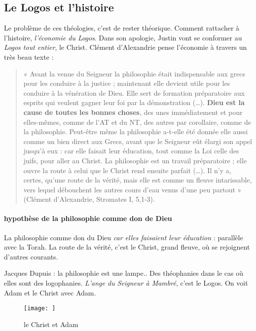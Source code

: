 \subsection{Le Logos et l’histoire} Le problème de ces théologies, c'est de rester théorique. Comment rattacher à l'histoire, \textit{l'économie du Logos}. Dans son apologie, Justin vont se conformer au \textit{Logos tout entier}, le Christ. Clément d'Alexandrie pense l'économie à travers un très beau texte : 



\begin{quote}
    « Avant la venue du Seigneur la philosophie était indispensable aux grecs pour les conduire à
la justice ; maintenant elle devient utile pour les conduire à la vénération de Dieu. Elle sert de
formation préparatoire aux esprits qui veulent gagner leur foi par la démonstration (…). \textbf{Dieu
est la cause de toutes les bonnes choses}, des unes immédiatement et pour elles-mêmes,
comme de l’AT et du NT, des autres par corollaire, comme de la philosophie. Peut-être même
la philosophie a-t-elle été donnée elle aussi comme un bien direct aux Grecs, avant que le
Seigneur eût élargi son appel jusqu’à eux : car elle faisait leur éducation, tout comme la Loi
celle des juifs, pour aller au Christ. La philosophie est un travail préparatoire ; elle ouvre la
route à celui que le Christ rend ensuite parfait (…). Il n’y a, certes, qu’une route de la vérité,
mais elle est comme un fleuve intarissable, vers lequel débouchent les autres cours d’eau
venus d’une peu partout » (Clément d’Alexandrie, Stromates I, 5,1-3).
\end{quote}

\paragraph{hypothèse de la philosophie comme don de Dieu}
 La philosophie comme don du Dieu \textit{car elles faisaient leur éducation} : parallèle avec la Torah. La route de la vérité, c'est le Christ, grand fleuve, où se rejoignent d'autres courants. 

 Jacques Dupuis : la philosophie est une lampe.. Des théophanies dans le cas où elles sont des logophanies. \textit{L'ange du Seigneur à Mambré}, c'est le Logos.
 On voit Adam et le Christ avec Adam.

\begin{figure}
    \centering
    \texttt{[image: ]}
    \caption{le Christ et Adam}
    \label{fig:my_label}
\end{figure}


